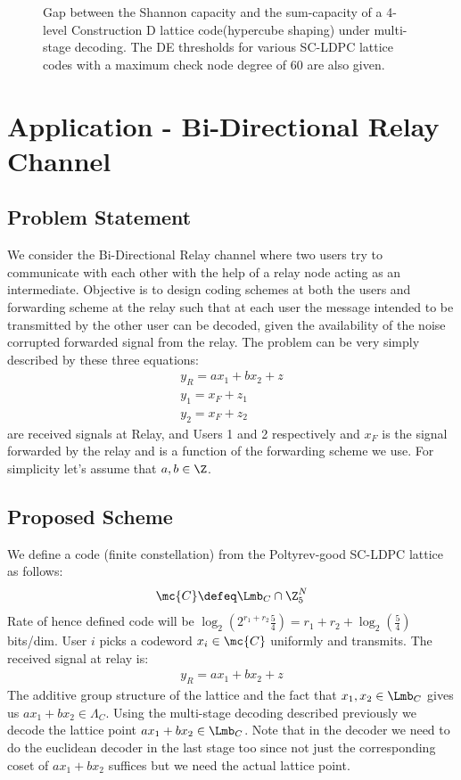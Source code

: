 \documentclass[journal]{IEEEtran}
\begin{document}
\begin{figure}
\centering
\setlength{}
\setlength{}

\caption{Gap between the Shannon capacity and the sum-capacity of a 4-level Construction D lattice code(hypercube shaping) under multi-stage decoding. The DE thresholds for various SC-LDPC lattice codes with a maximum check node degree of $60$ are also given.}	
\label{Fig:ShapingLoss}	
\end{figure}

\section{Application - Bi-Directional Relay Channel}
\subsection{Problem Statement}
We consider the Bi-Directional Relay channel where two users try to communicate with each other with the help of a relay node acting as an intermediate. Objective is to design coding schemes at both the users and forwarding scheme at the relay such that at each user the message intended to be transmitted by the other user can be decoded, given the availability of the noise corrupted forwarded signal from the relay.
The problem can be very simply described by these three equations: 
\begin{align*}
y_{R}=a x_{1}+b x_{2}+z \\
y_{1}=x_{F}+z_{1} \\
y_{2}=x_{F}+z_{2} 
\end{align*}
 are received signals at Relay, and Users 1 and 2 respectively and $x_{F}$ is the signal forwarded by the relay and is a function of the  forwarding scheme we use. For simplicity let's assume that $a,b\in \Z$.

\subsection{Proposed Scheme}
We define a code (finite constellation) from the Poltyrev-good SC-LDPC lattice as follows:
\begin{equation}
\mc{C}\defeq \Lmb_{C}\cap \Z_{5}^{N}
\end{equation}
Rate of hence defined code will be $\log_{2}(2^{r_{1}+r_{2}}\frac{5}{4})=r_{1}+r_{2}+\log_{2}(\frac{5}{4})$ bits/dim. User $i$ picks a codeword $x_{i}\in\mc{C}$ uniformly and transmits. The received signal at relay is:
\begin{align*}
y_{R}=a x_{1}+b x_{2} +z
\end{align*}
The additive group structure of the lattice and the fact that $x_{1},x_{2}\in \Lmb_{C}$ gives us $a x_{1}+b x_{2}\in \Lambda_{C}$. Using the multi-stage decoding described previously we decode the lattice point $a x_{1} + b x_{2}\in \Lmb_{C}$. Note that in the decoder we need to do the euclidean decoder in the last stage too since not just the corresponding coset of $a x_{1}+b x_{2}$ suffices but we need the actual lattice point.
\end{document}
